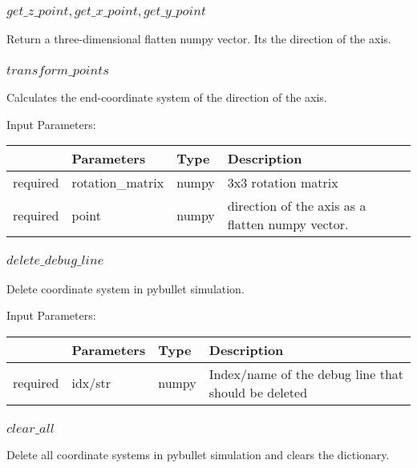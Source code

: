 \documentclass[
	ngerman,
	accentcolor=9c,%
	type=intern,
	marginpar=false
	]{tudapub}
\begin{document}
\subsubsection{$get\_z\_point, get\_x\_point, get\_y\_point$}
\noindent Return a three-dimensional flatten numpy vector. Its the direction of the axis.
\vspace{1cm}


\subsubsection{$transform\_points$}
\noindent Calculates the end-coordinate system of the direction of the axis.

\vspace{0.5cm}
\noindent Input Parameters:
\vspace{0.5cm}

\begin{tabular}{|p{}|p{}|p{}| p{}|}
\hline
 & \textbf{Parameters} & \textbf{Type} & \textbf{Description} \\
\hline
required & rotation\_matrix & numpy & 3x3 rotation matrix \\
\hline
required & point & numpy & direction of the axis as a flatten numpy vector. \\
\hline
\end{tabular}
\vspace{1cm}

\subsubsection{$delete\_debug\_line$}
\noindent Delete coordinate system in pybullet simulation.

\vspace{0.5cm}
\noindent Input Parameters:
\vspace{0.5cm}

\begin{tabular}{|p{}|p{}|p{}| p{}|}
\hline
 & \textbf{Parameters} & \textbf{Type} & \textbf{Description} \\
\hline
required & idx/str & numpy & Index/name of the debug line that should be deleted \\
\hline
\end{tabular}
\vspace{1cm}

\subsubsection{$clear\_all$}
\noindent Delete all coordinate systems in pybullet simulation and clears the dictionary.
\vspace{1cm}
\end{document}
